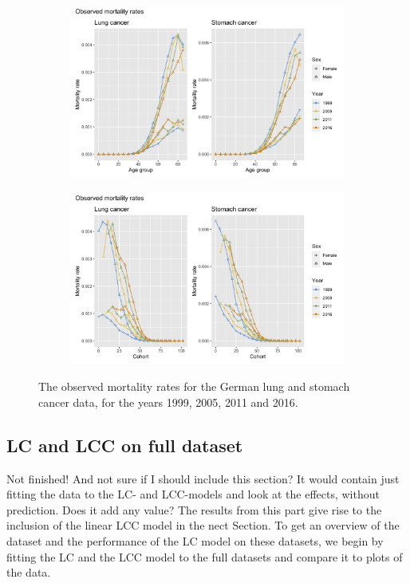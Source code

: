 \begin{figure}
    \centering
    \begin{subfigure}[b]{.45\linewidth}
        \includegraphics[width=\linewidth]{real-data/real-data-univariate/Figures/data-age-rate.png}
    \end{subfigure}
    \begin{subfigure}[b]{.45\linewidth}
        \includegraphics[width=\linewidth]{real-data/real-data-univariate/Figures/data-cohort-rate.png}
    \end{subfigure}
    \caption{The observed mortality rates for the German lung and stomach cancer data, for the years 1999, 2005, 2011 and 2016.}
    \label{fig:data-rate}
\end{figure}

\subsection{LC and LCC on full dataset}
\label{sec:LC-full-data}
\textcolor{myDarkBlue}{Not finished! And not sure if I should include this section? It would contain just fitting the data to the LC- and LCC-models and look at the effects, without prediction. Does it add any value? The results from this part give rise to the inclusion of the linear LCC model in the nect Section. }
To get an overview of the dataset and the performance of the LC model on these datasets, we begin by fitting the LC and the LCC model to the full datasets and compare it to plots of the data. 


